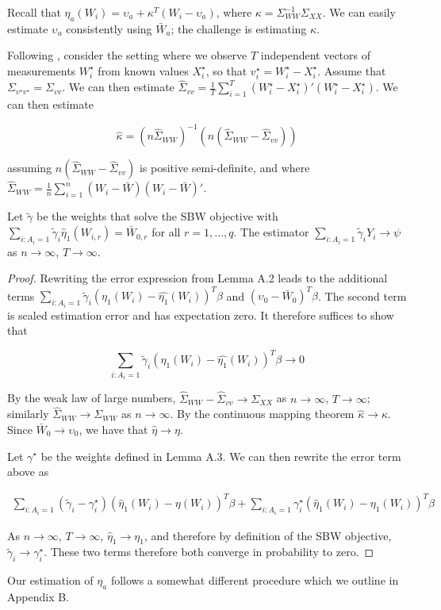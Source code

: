 Recall that $\eta_a(W_i) = \upsilon_a + \kappa^T(W_i - \upsilon_a)$, where $\kappa = \Sigma_{WW}^{-1}\Sigma_{XX}$. We can easily estimate $\upsilon_a$ consistently using $\bar{W}_a$; the challenge is estimating $\kappa$. 

Following \cite{gleser1992importance}, consider the setting where we observe $T$ independent vectors of measurements $W_i^\star$ from known values $X_i^\star$, so that $v_i^\star = W_i^\star - X_i^\star$. Assume that $\Sigma_{v^\star v^\star} = \Sigma_{vv}$. We can then estimate $\hat{\Sigma}_{vv} = \frac{1}{T}\sum_{i=1}^T(W_i^\star - X_i^\star)'(W_i^\star - X_i^\star)$. We can then estimate

$$
\hat{\kappa} = (n\hat{\Sigma}_{WW})^{-1}(n(\hat{\Sigma}_{WW} - \hat{\Sigma}_{vv}))
$$

assuming $n(\hat{\Sigma}_{WW} - \hat{\Sigma}_{vv})$ is positive semi-definite, and where $\hat{\Sigma}_{WW} = \frac{1}{n}\sum_{i=1}^n (W_i - \bar{W})(W_i - \bar{W})'$. 

\begin{proposition}
Let $\tilde{\gamma}$ be the weights that solve the SBW objective with $\sum_{i: A_i = 1}\tilde{\gamma}_i\hat{\eta}_1(W_{i, r}) = \bar{W}_{0, r}$ for all $r = 1, ..., q$. The estimator $\sum_{i: A_i = 1}\tilde{\gamma}_iY_i \to \psi$ as $n \to \infty$, $T \to \infty$.
\end{proposition}

\begin{proof}

Rewriting the error expression from Lemma A.2 leads to the additional terms $\sum_{i: A_i = 1}\tilde{\gamma}_i(\eta_1(W_i) - \hat{\eta_1}(W_i))^T\beta$ and $(\upsilon_0 - \bar{W}_0)^T\beta$. The second term is scaled estimation error and has expectation zero. It therefore suffices to show that 

$$
\sum_{i: A_i = 1}\tilde{\gamma}_i(\eta_1(W_i) - \hat{\eta_1}(W_i))^T\beta \to 0
$$

By the weak law of large numbers, $\hat{\Sigma}_{WW} - \hat{\Sigma}_{vv} \to \Sigma_{XX}$ as $n \to \infty$, $T \to \infty$; similarly $\hat{\Sigma}_{WW} \to \Sigma_{WW}$ as $n \to \infty$. By the continuous mapping theorem $\hat{\kappa} \to \kappa$. Since $\bar{W}_0 \to \upsilon_0$, we have that $\hat{\eta} \to \eta$. 

Let $\gamma^\star$ be the weights defined in Lemma A.3. We can then rewrite the error term above as

\begin{align*}
\sum_{i: A_i = 1}(\tilde{\gamma}_i - \gamma_i^\star)(\hat{\eta}_1(W_i) - \eta(W_i))^T\beta + \sum_{i: A_i = 1}\gamma_i^\star(\hat{\eta}_1(W_i) - \eta_1(W_i))^T\beta
\end{align*}

As $n \to \infty$, $T \to \infty$, $\hat{\eta}_1 \to \eta_1$, and therefore by definition of the SBW objective, $\tilde{\gamma}_i \to \gamma_i^\star$. These two terms therefore both converge in probability to zero. 

\end{proof}

Our estimation of $\eta_a$ follows a somewhat different procedure which we outline in Appendix B.

